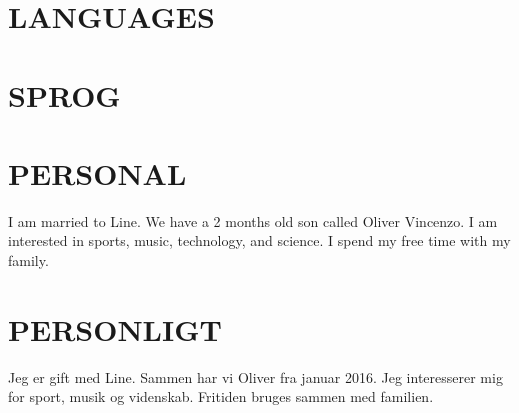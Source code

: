 \documentclass[11pt,a4paper,sans]{moderncv}        %
\begin{document}
\ifenglish
\section{LANGUAGES}
\else
\section{SPROG}
\fi

\ifenglish
\section{PERSONAL}
I am married to Line. We have a 2 months old son called Oliver Vincenzo. I am interested in sports, music, technology, and science. I spend my free time with my family.
\else
\section{PERSONLIGT}
Jeg er gift med Line. Sammen har vi Oliver fra januar 2016. Jeg interesserer mig for sport, musik og videnskab. Fritiden bruges sammen med familien.
\fi
\end{document}
